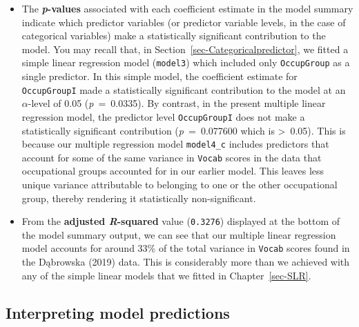 \documentclass[
  letterpaper,
  DIV=11,
  numbers=noendperiod]{scrreprt}
\newenvironment{Shaded}{\begin{snugshade}}{\end{snugshade}}
\newcommand{\FunctionTok}[1]{\textcolor[rgb]{0.28,0.35,0.67}{#1}}
\newcommand{\NormalTok}[1]{\textcolor[rgb]{0.00,0.23,0.31}{#1}}
\newcommand{\SpecialCharTok}[1]{\textcolor[rgb]{0.37,0.37,0.37}{#1}}
\begin{document}
\begin{itemize}
\begin{Shaded}
\end{Shaded}
\item
  The \textbf{\emph{p}-values} associated with each coefficient estimate
  in the model summary indicate which predictor variables (or predictor
  variable levels, in the case of categorical variables) make a
  statistically significant contribution to the model. You may recall
  that, in Section~\ref{sec-Categoricalpredictor}, we fitted a simple
  linear regression model (\texttt{model3}) which included only
  \texttt{OccupGroup} as a single predictor. In this simple model, the
  coefficient estimate for \texttt{OccupGroupI} made a statistically
  significant contribution to the model at an \(\alpha\)-level of 0.05
  (\emph{p}~=~0.0335). By contrast, in the present multiple linear
  regression model, the predictor level \texttt{OccupGroupI} does not
  make a statistically significant contribution (\emph{p}~=~0.077600
  which is \textgreater~0.05). This is because our multiple regression
  model \texttt{model4\_c} includes predictors that account for some of
  the same variance in \texttt{Vocab} scores in the data that
  occupational groups accounted for in our earlier model. This leaves
  less unique variance attributable to belonging to one or the other
  occupational group, thereby rendering it statistically
  non-significant.
\item
  From the \textbf{adjusted \emph{R}-squared} value (\texttt{0.3276})
  displayed at the bottom of the model summary output, we can see that
  our multiple linear regression model accounts for around 33\% of the
  total variance in \texttt{Vocab} scores found in the Dąbrowska (2019)
  data. This is considerably more than we achieved with any of the
  simple linear models that we fitted in Chapter~\ref{sec-SLR}.
\end{itemize}

\subsection{Interpreting model predictions}\label{sec-ModelPredictions}
\end{document}
